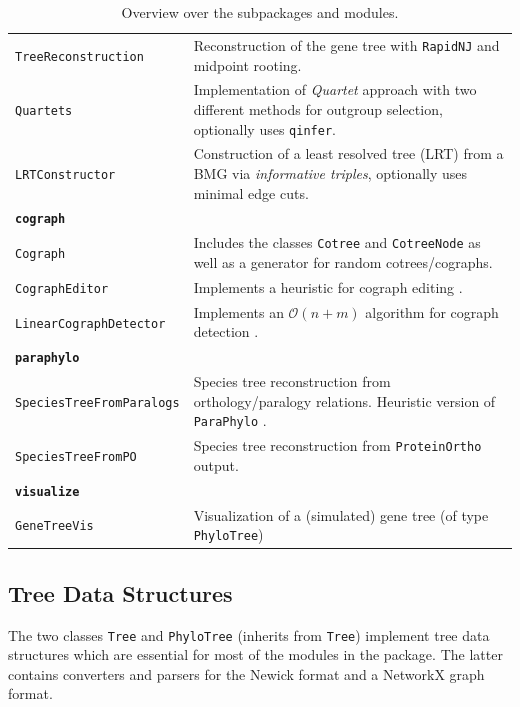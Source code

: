 \documentclass[hidelinks,11pt]{scrreprt}
\begin{document}
\begin{table}[H]
\begin{tabularx}{\textwidth}{|p{}|X|}
		\texttt{TreeReconstruction} & 
		Reconstruction of the gene tree with \texttt{RapidNJ} \citep{simonsen2008} and midpoint rooting. \\
		\texttt{Quartets} & 
		Implementation of \emph{Quartet} approach with two different methods for outgroup selection, optionally uses \texttt{qinfer}. \\
		\texttt{LRTConstructor} & 
		Construction of a least resolved tree (LRT) from a BMG via \emph{informative triples}, optionally uses minimal edge cuts. \\
		\hline
		\multicolumn{2}{|l|}{\textbf{\texttt{cograph}}}\\
		\hline
		\texttt{Cograph} & 
		Includes the classes \texttt{Cotree} and \texttt{CotreeNode} as well as a generator for random cotrees/cographs. \\
		\texttt{CographEditor} & 
		Implements a heuristic for cograph editing \citep{crespelle2019}. \\
		\texttt{LinearCographDetector} & 
		Implements an $\mathcal{O}(n+m)$ algorithm for cograph detection \citep{corneil1985}. \\
		\hline
		\multicolumn{2}{|l|}{\textbf{\texttt{paraphylo}}}\\
		\hline
		\texttt{SpeciesTreeFromParalogs} & 
		Species tree reconstruction from orthology/paralogy relations. Heuristic version of \texttt{ParaPhylo} \cite{hellmuth2015}. \\
		\texttt{SpeciesTreeFromPO} & 
		Species tree reconstruction from \texttt{ProteinOrtho} \cite{lechner2011} output. \\
		\hline
		\multicolumn{2}{|l|}{\textbf{\texttt{visualize}}}\\
		\hline
		\texttt{GeneTreeVis} & 
		Visualization of a (simulated) gene tree (of type \texttt{PhyloTree}) \\
		\hline
	\end{tabularx}
	\caption{Overview over the subpackages and modules.}
	\label{tab:module_overview}
\end{table}


\subsection{Tree Data Structures}

The two classes \texttt{Tree} and \texttt{PhyloTree} (inherits from \texttt{Tree}) implement tree data structures which are essential for most of the modules in the package.
The latter contains converters and parsers for the Newick format and a NetworkX graph format.
\end{document}
